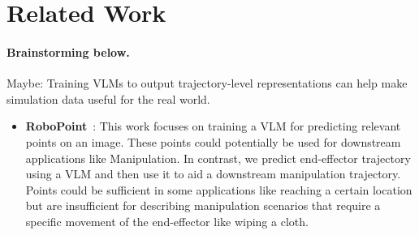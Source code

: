 

\section{Related Work}

\paragraph{Brainstorming below.}
Maybe: Training VLMs to output trajectory-level representations can help make simulation data useful for the real world.
\begin{itemize}
    \item \textbf{RoboPoint}~\citep{yuan2024robopoint}: This work focuses on training a VLM for predicting relevant points on an image. These points could potentially be used for downstream applications like Manipulation. In contrast, we predict end-effector trajectory using a VLM and then use it to aid a downstream manipulation trajectory. Points could be sufficient in some applications like reaching a certain location but are insufficient for describing manipulation scenarios that require a specific movement of the end-effector like wiping a cloth.
    

\end{itemize}
